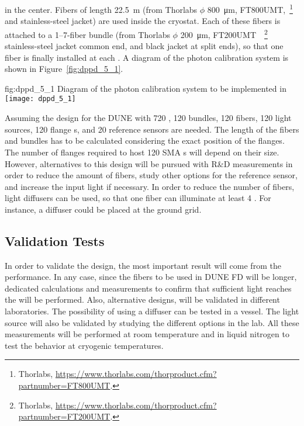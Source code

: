 in the center. Fibers of length \SI{22.5}{m} (from Thorlabs $\phi$ \SI{800}{\micro\meter}, FT800UMT,~\footnote{Thorlabs\texttrademark{}, \url{https://www.thorlabs.com/thorproduct.cfm?partnumber=FT800UMT}.} %
 and stainless-steel jacket) are used inside the cryostat. Each of these fibers is attached to a \numrange{1}{7}-fiber bundle (from Thorlabs $\phi$ \SI{200}{\micro\meter}, FT200UMT~~\footnote{Thorlabs\texttrademark{}, \url{https://www.thorlabs.com/thorproduct.cfm?partnumber=FT200UMT}.} %
 stainless-steel jacket common end, and black jacket at split ends), so that one fiber is finally installed at each . A diagram of the  photon calibration system is shown in Figure~\ref{fig:dppd_5_1}. %

\begin{dunefigure}{fig:dppd_5_1}
{Diagram of the photon calibration system to be implemented in }
\texttt{[image: dppd\_5\_1]}
\end{dunefigure}

Assuming the  design for the DUNE  with \num{720} , \num{120} bundles, \num{120} fibers, \num{120} light sources, \num{120} flange \fdth{}s, and \num{20} reference sensors are needed. The length of the fibers and bundles has to be calculated considering the exact position of the \fdth flanges. The number of flanges required to host \num{120} SMA \fdth{}s will depend on their size. However, alternatives to this design will be pursued with R\&D measurements in order to reduce the amount of fibers, study other options for the reference sensor, and increase the input light if necessary. In order to reduce the number of fibers, light diffusers can be used, so that one fiber can illuminate at least \num{4} . For instance, a diffuser could be placed at the ground grid. 

\subsection{Validation Tests}
\label{sec:fddp-pd-5.2}

In order to validate the design, the most important result will come from the  performance. In any case, since the fibers to be used in DUNE FD will be longer, dedicated calculations and measurements to confirm that sufficient light reaches the  will be performed. Also, alternative designs, will be validated in different laboratories. The possibility of using a diffuser can be tested in a vessel. The light source will also be validated by studying the different options in the lab. All these measurements will be performed at room temperature and in liquid nitrogen to test the behavior at cryogenic temperatures.


